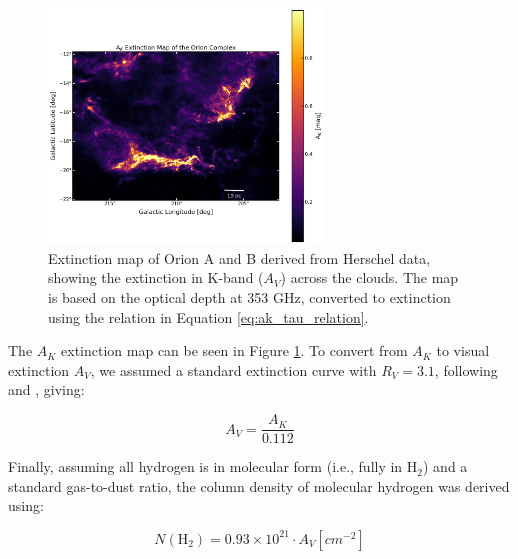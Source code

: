 \begin{figure}[t]
    \centering
    \includegraphics[width=0.65\textwidth]{figures/extinction_map.png}
    \caption{Extinction map of Orion A and B derived from Herschel data, showing the extinction in K-band ($A_V$) across the clouds. The map is based on the optical depth at 353 GHz, converted to extinction using the relation in Equation \ref{eq:ak_tau_relation}.}
    \label{fig:extinction_map}
\end{figure}

The $A_K$ extinction map can be seen in Figure \ref{fig:extinction_map}. 
To convert from $A_K$ to visual extinction $A_V$, we assumed a standard extinction curve with $R_V = 3.1$, following \cite{bohlin1978survey} and \cite{rieke1985interstellar}, giving:

\begin{equation}
    A_V = \frac{A_K}{0.112}
    \label{eq:av_ak_relation}
\end{equation}

Finally, assuming all hydrogen is in molecular form (i.e., fully in H$_2$) and a standard gas-to-dust ratio, the column density of molecular hydrogen was derived using:

\begin{equation}
    N(\mathrm{H_2}) = 0.93 \times 10^{21} \cdot A_V [cm^{-2}]
    \label{eq:n_h2_av_relation}
\end{equation}

